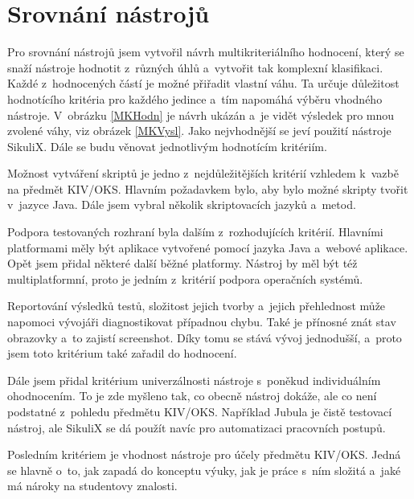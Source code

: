 \chapter{Srovnání nástrojů}
Pro srovnání nástrojů jsem vytvořil návrh multikriteriálního hodnocení, který se snaží nástroje hodnotit z~různých úhlů a~vytvořit tak komplexní klasifikaci. Každé z~hodnocených částí je možné přiřadit vlastní váhu. Ta určuje důležitost hodnotícího kritéria pro každého jedince a~tím napomáhá výběru vhodného nástroje. V~obrázku \ref{MKHodn} je návrh ukázán a~je vidět výsledek pro mnou zvolené váhy, viz obrázek \ref{MKVysl}. Jako nejvhodnější se jeví použití nástroje SikuliX. Dále se budu věnovat jednotlivým hodnotícím kritériím.

Možnost vytváření skriptů je jedno z~nejdůležitějších kritérií vzhledem k~vazbě na předmět KIV/OKS. Hlavním požadavkem bylo, aby bylo možné skripty tvořit v~jazyce Java. Dále jsem vybral několik skriptovacích jazyků a~metod.

Podpora testovaných rozhraní byla dalším z~rozhodujících kritérií. Hlavními platformami měly být aplikace vytvořené pomocí jazyka Java a~webové aplikace. Opět jsem přidal některé další běžné platformy. Nástroj by měl být též multiplatformní, proto je jedním z~kritérií podpora operačních systémů.

Reportování výsledků testů, složitost jejich tvorby a~jejich přehlednost může napomoci vývojáři diagnostikovat případnou chybu. Také je přínosné znát stav obrazovky a~to zajistí screenshot. Díky tomu se stává vývoj jednodušší, a~proto jsem toto kritérium také zařadil do hodnocení.

Dále jsem přidal kritérium univerzálnosti nástroje s~poněkud individuálním ohodnocením. To je zde myšleno tak, co obecně nástroj dokáže, ale co není podstatné z~pohledu předmětu KIV/OKS. Například Jubula je čistě testovací nástroj, ale SikuliX se dá použít navíc pro automatizaci pracovních postupů.

Posledním kritériem je vhodnost nástroje pro účely předmětu KIV/OKS. Jedná se hlavně o~to, jak zapadá do konceptu výuky, jak je práce s~ním složitá a~jaké má nároky na studentovy znalosti.

